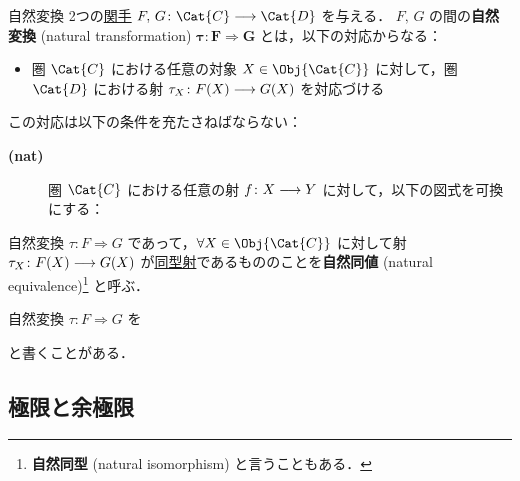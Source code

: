 \documentclass[TQFT_main]{subfiles}
\begin{document}
\begin{mydef}[label=def:nat]{自然変換}
    2つの\hyperref[def:functor]{関手} $F,\, G \colon \Cat{C} \lto \Cat{D}$ を与える．
    $F,\, G$ の間の\textbf{自然変換} (natural transformation) $\bm{\tau \colon F \Longrightarrow G}$ とは，以下の対応からなる：
    \begin{itemize}
        \item 圏 $\Cat{C}$ における任意の対象 $X \in \Obj{\Cat{C}}$ に対して，圏 $\Cat{D}$ における射 $\tau_X \colon F(X) \longrightarrow G(X)$ を対応づける
    \end{itemize}
    この対応は以下の条件を充たさねばならない：
    \begin{description}
        \item[\textbf{(nat)}]  
        圏 $\Cat{C}$ における任意の射 $f \colon X \longrightarrow Y$ に対して，以下の図式を可換にする：
        \begin{center}
        \end{center}
    \end{description}
    
    \tcblower 

    自然変換 $\tau \colon F \Longrightarrow G$ であって，$\forall X \in \Obj{\Cat{C}}$ に対して射 $\tau_X \colon F(X) \longrightarrow G(X)$ が\hyperref[def:iso]{同型射}であるもののことを\textbf{自然同値} (natural equivalence)\footnote{\textbf{自然同型} (natural isomorphism) と言うこともある．} と呼ぶ．
\end{mydef}

自然変換 $\tau \colon F \Longrightarrow G$ を
\begin{center}
\end{center}
と書くことがある．    

\subsection{極限と余極限}
\end{document}
